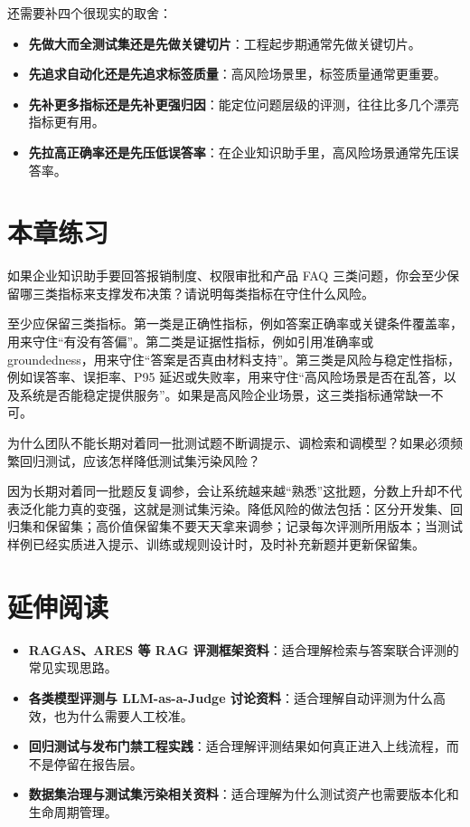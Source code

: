 还需要补四个很现实的取舍：
\begin{itemize}
  \item \textbf{先做大而全测试集还是先做关键切片}：工程起步期通常先做关键切片。
  \item \textbf{先追求自动化还是先追求标签质量}：高风险场景里，标签质量通常更重要。
  \item \textbf{先补更多指标还是先补更强归因}：能定位问题层级的评测，往往比多几个漂亮指标更有用。
  \item \textbf{先拉高正确率还是先压低误答率}：在企业知识助手里，高风险场景通常先压误答率。
\end{itemize}

\section{本章练习}
\begin{exercise}[指标设计]
如果企业知识助手要回答报销制度、权限审批和产品 FAQ 三类问题，你会至少保留哪三类指标来支撑发布决策？请说明每类指标在守住什么风险。
\end{exercise}

\begin{solution}
至少应保留三类指标。第一类是{\heiti 正确性指标}，例如答案正确率或关键条件覆盖率，用来守住“有没有答偏”。第二类是{\heiti 证据性指标}，例如引用准确率或 groundedness，用来守住“答案是否真由材料支持”。第三类是{\heiti 风险与稳定性指标}，例如误答率、误拒率、P95 延迟或失败率，用来守住“高风险场景是否在乱答，以及系统是否能稳定提供服务”。如果是高风险企业场景，这三类指标通常缺一不可。
\end{solution}

\begin{exercise}[测试集污染]
为什么团队不能长期对着同一批测试题不断调提示、调检索和调模型？如果必须频繁回归测试，应该怎样降低测试集污染风险？
\end{exercise}

\begin{solution}
因为长期对着同一批题反复调参，会让系统越来越“熟悉”这批题，分数上升却不代表泛化能力真的变强，这就是测试集污染。降低风险的做法包括：区分开发集、回归集和保留集；高价值保留集不要天天拿来调参；记录每次评测所用版本；当测试样例已经实质进入提示、训练或规则设计时，及时补充新题并更新保留集。
\end{solution}

\section{延伸阅读}
\begin{itemize}
  \item \textbf{RAGAS、ARES 等 RAG 评测框架资料}：适合理解检索与答案联合评测的常见实现思路。
  \item \textbf{各类模型评测与 LLM-as-a-Judge 讨论资料}：适合理解自动评测为什么高效，也为什么需要人工校准。
  \item \textbf{回归测试与发布门禁工程实践}：适合理解评测结果如何真正进入上线流程，而不是停留在报告层。
  \item \textbf{数据集治理与测试集污染相关资料}：适合理解为什么测试资产也需要版本化和生命周期管理。
\end{itemize}

